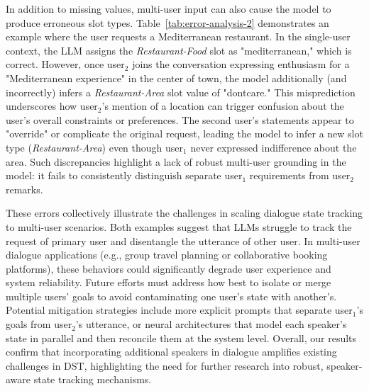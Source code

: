 In addition to missing values, multi-user input can also cause the model to produce erroneous slot types. Table~\ref{tab:error-analysis-2} demonstrates an example where the user requests a Mediterranean restaurant. In the single-user context, the LLM assigns the \textit{Restaurant-Food} slot as "mediterranean," which is correct. However, once user$_2$ joins the conversation expressing enthusiasm for a "Mediterranean experience" in the center of town, the model additionally (and incorrectly) infers a \textit{Restaurant-Area} slot value of "dontcare." This misprediction underscores how user$_2$’s mention of a location can trigger confusion about the user’s overall constraints or preferences. The second user’s statements appear to "override" or complicate the original request, leading the model to infer a new slot type (\textit{Restaurant-Area}) even though user$_1$ never expressed indifference about the area. Such discrepancies highlight a lack of robust multi-user grounding in the model: it fails to consistently distinguish separate user$_1$ requirements from user$_2$ remarks.

These errors collectively illustrate the challenges in scaling dialogue state tracking to multi-user scenarios. Both examples suggest that LLMs struggle to track the request of primary user and disentangle the utterance of other user. In multi-user dialogue applications (e.g., group travel planning or collaborative booking platforms), these behaviors could significantly degrade user experience and system reliability. Future efforts must address how best to isolate or merge multiple users’ goals to avoid contaminating one user’s state with another’s. Potential mitigation strategies include more explicit prompts that separate user$_1$’s goals from user$_2$’s utterance, or neural architectures that model each speaker’s state in parallel and then reconcile them at the system level. Overall, our results confirm that incorporating additional speakers in dialogue amplifies existing challenges in DST, highlighting the need for further research into robust, speaker-aware state tracking mechanisms.


